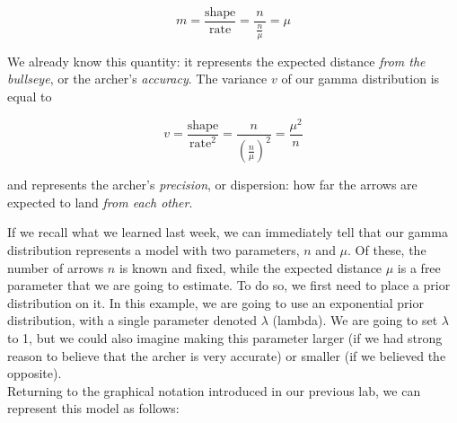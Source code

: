 \documentclass[12pt]{article}
\newcommand*{\Biggg}[1]{\vcenter{\hbox{\scalebox{3}{\ensuremath#1}}}}
\newcommand*{\Bigggg}[1]{\vcenter{\hbox{\scalebox{8}{\ensuremath#1}}}}
\begin{document}
\[ m = \frac{\text{shape}}{\text{rate}} = \frac{\,n\,}{\frac{n}{\mu}} = \mu \]

\noindent We already know this quantity: it represents the expected distance \textit{from the bullseye}, or the archer's \textit{accuracy}. The variance $v$ of our gamma distribution is equal to 

\[ v = \frac{\text{shape}}{\text{rate}^2} = \frac{n}{\left(\frac{n}{\mu}\right)^2} = \frac{\mu^2}{n} \]

\noindent and represents the archer's \textit{precision}, or dispersion: how far the arrows are expected to land \textit{from each other}.

\noindent If we recall what we learned last week, we can immediately tell that our gamma distribution represents a model with two parameters, $n$ and $\mu$. Of these, the number of arrows $n$ is known and fixed, while the expected distance $\mu$ is a free parameter that we are going to estimate. To do so, we first need to place a prior distribution on it. In this example, we are going to use an exponential prior distribution, with a single parameter denoted $\lambda$ (lambda). We are going to set $\lambda$ to 1, but we could also imagine making this parameter larger (if we had strong reason to believe that the archer is very accurate) or smaller (if we believed the opposite). \\

\noindent Returning to the graphical notation introduced in our previous lab, we can represent this model as follows:

\begin{figure}[h]
\centering
{}
\end{figure}
\end{document}
